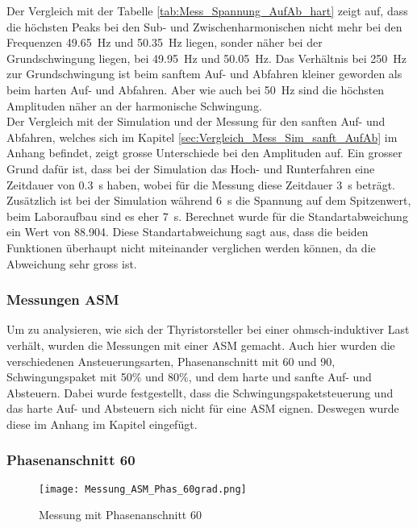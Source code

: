 Der Vergleich mit der Tabelle \ref{tab:Mess_Spannung_AufAb_hart} zeigt auf, dass die höchsten Peaks bei den Sub- und Zwischenharmonischen nicht mehr bei den Frequenzen \SI{49.65}{Hz} und \SI{50.35}{Hz} liegen, sonder näher bei der Grundschwingung liegen, bei \SI{49.95}{Hz} und \SI{50.05}{Hz}. Das Verhältnis bei \SI{250}{Hz} zur Grundschwingung ist beim sanftem Auf- und Abfahren kleiner geworden als beim harten Auf- und Abfahren. Aber wie auch bei \SI{50}{Hz} sind die höchsten Amplituden näher an der harmonische Schwingung. \\
Der Vergleich mit der Simulation und der Messung für den sanften Auf- und Abfahren, welches sich im Kapitel \ref{sec:Vergleich_Mess_Sim_sanft_AufAb} im Anhang befindet, zeigt grosse Unterschiede bei den Amplituden auf. Ein grosser Grund dafür ist, dass bei der Simulation das Hoch- und Runterfahren eine Zeitdauer von \SI{0.3}{s} haben, wobei für die Messung diese Zeitdauer \SI{3}{s} beträgt. Zusätzlich ist bei der Simulation während \SI{6}{s} die Spannung auf dem Spitzenwert, beim Laboraufbau sind es eher \SI{7}{s}.  Berechnet wurde für die Standartabweichung ein Wert von 88.904. Diese Standartabweichung sagt aus, dass die beiden Funktionen überhaupt nicht miteinander verglichen werden können, da die Abweichung sehr gross ist.






\subsubsection{Messungen ASM}
Um zu analysieren, wie sich der Thyristorsteller bei einer ohmsch-induktiver Last verhält, wurden die Messungen mit einer ASM gemacht. Auch hier wurden die verschiedenen Ansteuerungsarten, Phasenanschnitt mit 60\textdegree \hspace{0.02cm} und 90\textdegree \hspace{0.02cm}, Schwingungspaket mit 50\% und 80\%, und dem harte und sanfte Auf- und Absteuern. Dabei wurde festgestellt, dass die Schwingungspaketsteuerung und das harte Auf- und Absteuern sich nicht für eine ASM eignen. 
Deswegen wurde diese im Anhang im Kapitel  eingefügt. 

\subsubsection*{Phasenanschnitt 60\textdegree}
\begin{figure}[ht!]
	\centering
	\texttt{[image: Messung\_ASM\_Phas\_60grad.png]}	
	\caption{Messung mit Phasenanschnitt 60\textdegree}\label{fig:Mess_ASM_Phas60}
\end{figure}

